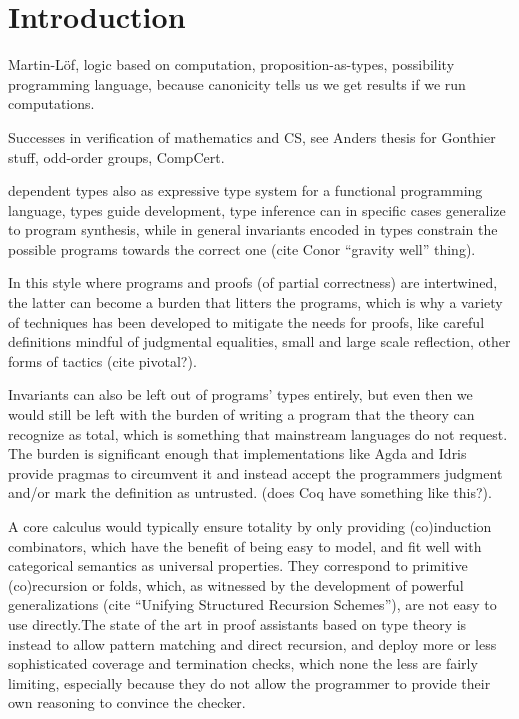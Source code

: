 \documentclass{book}
\begin{document}
\chapter{Introduction}

Martin-Löf, logic based on computation, proposition-as-types,
possibility programming language, because canonicity tells us we get results
if we run computations.

  Successes in verification of mathematics and CS, see Anders thesis for Gonthier stuff, odd-order groups, CompCert.

  dependent types also as expressive type system for a functional
  programming language, types guide development, type inference can in
  specific cases generalize to program synthesis, while in general
  invariants encoded in types constrain the possible programs towards
  the correct one (cite Conor ``gravity well'' thing).

  In this style where programs and proofs (of partial correctness) are
  intertwined, the latter can become a burden that litters the
  programs, which is why a variety of techniques has been developed to
  mitigate the needs for proofs, like careful definitions mindful of judgmental equalities, small and
  large scale reflection, other forms of tactics (cite pivotal?).

  Invariants can also be left out of programs' types entirely, but
  even then we would still be left with the burden of writing a
  program that the theory can recognize as total, which is something
  that mainstream languages do not request. The burden is significant
  enough that implementations like Agda and Idris provide pragmas to
  circumvent it and instead accept the programmers judgment and/or
  mark the definition as untrusted. (does Coq have something like this?).

  A core calculus would typically ensure totality by only providing
  (co)induction combinators, which have the benefit of being easy to
  model, and fit well with categorical semantics as universal
  properties.  They correspond to primitive (co)recursion or folds,
  which, as witnessed by the development of powerful generalizations
  (cite ``Unifying Structured Recursion Schemes''), are not easy to
  use directly.The state of the art in proof assistants based on type
  theory is instead to allow pattern matching and direct recursion,
  and deploy more or less sophisticated coverage and termination
  checks, which none the less are fairly limiting, especially because
  they do not allow the programmer to provide their own reasoning to
  convince the checker.
\end{document}
